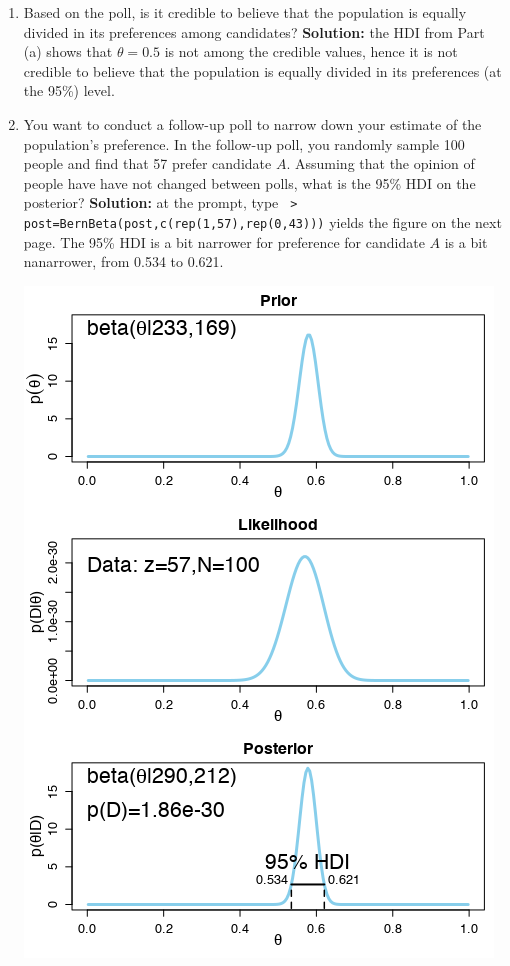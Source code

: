 \begin{Example}
\begin{enumerate}[noitemsep,label=(\alph*)]
\begin{center}
\end{center}
\item  Based on the poll, is it credible to believe that the population is equally divided in its preferences among candidates? \newl \textbf{Solution:} the HDI from Part (a) shows that $\theta=0.5$ is not among the credible values, hence it is not credible to believe that the population is equally divided in its preferences (at the 95\%) level.
\item You want to conduct a follow-up poll to narrow down your estimate of the population's preference. In the follow-up poll, you randomly sample 100 people and find that 57 prefer candidate $A$. Assuming that the opinion of people have have not changed between polls, what is the 95\% HDI on the posterior? \newl \textbf{Solution:} 
at the prompt, type \newl \footnotesize \texttt{
> post=BernBeta(post,c(rep(1,57),rep(0,43)))}\normalsize \newl
yields the figure on the next page. The 95\% HDI is a bit narrower for preference for candidate $A$ is a bit nanarrower, from 0.534 to 0.621.
\begin{center}\includegraphics[width=\linewidth]{Images/example8b.png}\end{center}

\end{enumerate}
\end{Example}
